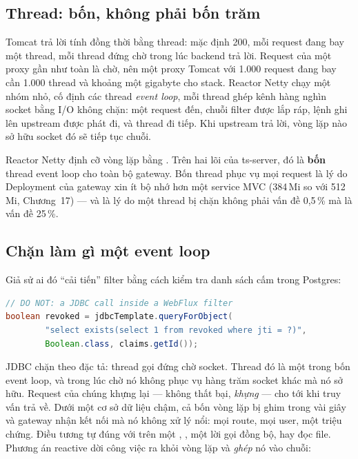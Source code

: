 \subsection{Thread: bốn, không phải bốn trăm}

Tomcat trả lời tính đồng thời bằng thread: mặc định 200, mỗi request
đang bay một thread, mỗi thread đứng chờ trong lúc backend trả lời.
Request của một proxy gần như toàn là chờ, nên một proxy Tomcat với
1.000 request đang bay cần 1.000 thread và khoảng một gigabyte cho
stack. Reactor Netty chạy một nhóm nhỏ, cố định các thread
\emph{event loop}, mỗi thread ghép kênh hàng nghìn socket bằng I/O
không chặn: một request đến, chuỗi filter được lắp ráp, lệnh ghi lên
upstream được phát đi, và thread đi tiếp. Khi upstream trả lời, vòng
lặp nào sở hữu socket đó sẽ tiếp tục chuỗi.

\begin{hardware}
Reactor Netty định cỡ vòng lặp bằng .
Trên hai lõi của ts-server, đó là \textbf{bốn} thread event loop cho
toàn bộ gateway. Bốn thread phục vụ mọi request là lý do Deployment của
gateway xin ít bộ nhớ hơn một service MVC (384\,Mi so với 512\,Mi,
Chương~17) --- và là lý do một thread bị chặn không phải vấn đề
0,5\,\% mà là vấn đề 25\,\%.
\end{hardware}

\subsection{Chặn làm gì một event loop}

Giả sử ai đó ``cải tiến'' filter bằng cách kiểm tra danh sách cấm trong
Postgres:

\begin{lstlisting}[language=Java]
// DO NOT: a JDBC call inside a WebFlux filter
boolean revoked = jdbcTemplate.queryForObject(
        "select exists(select 1 from revoked where jti = ?)",
        Boolean.class, claims.getId());
\end{lstlisting}

JDBC chặn theo đặc tả: thread gọi đứng chờ socket. Thread đó là một
trong bốn event loop, và trong lúc chờ nó không phục vụ hàng trăm
socket khác mà nó sở hữu. Request của chúng khựng lại --- không thất
bại, \emph{khựng} --- cho tới khi truy vấn trả về. Dưới một cơ sở dữ
liệu chậm, cả bốn vòng lặp bị ghim trong vài giây và gateway nhận kết
nối mà nó không xử lý nổi: mọi route, mọi user, một triệu chứng. Điều
tương tự đúng với  trên một ,
, một lời gọi  đồng bộ, hay đọc
file. Phương án reactive dời công việc ra khỏi vòng lặp và
\emph{ghép} nó vào chuỗi:

